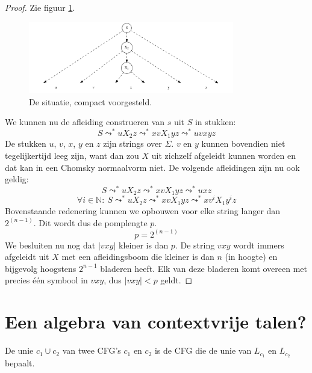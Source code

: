 \documentclass[main.tex]{subfiles}
\begin{document}
\begin{st}
\begin{proof}
    Zie figuur \ref{fig:afleidingsboom-compact}.
    \begin{figure}[H]
      \centering
      \includegraphics[width=0.8\textwidth]{assets/pompend-lemma-herhaling.png}      
      \caption{De situatie, compact voorgesteld.}
      \label{fig:afleidingsboom-compact}
    \end{figure}
    We kunnen nu de afleiding construeren van $s$ uit $S$ in stukken:
    \[ S \leadsto^{*} uX_{2}z \leadsto^{*} xvX_{1}yz \leadsto^{*} uvxyz \]
    De stukken $u$, $v$, $x$, $y$ en $z$ zijn strings over $\Sigma$.
    $v$ en $y$ kunnen bovendien niet tegelijkertijd leeg zijn, want dan zou $X$ uit zichzelf afgeleidt kunnen worden en dat kan in een Chomsky normaalvorm niet.
    De volgende afleidingen zijn nu ook geldig:
    \[ S \leadsto^{*} uX_{2}z \leadsto^{*} xvX_{1}yz \leadsto^{*} uxz \]
    \[ \forall i \in \mathbb{N}:\ S \leadsto^{*} uX_{2}z \leadsto^{*} xvX_{1}yz \leadsto^{*} xv^{i}X_{1}y^{i}z \]
    Bovenstaande redenering kunnen we opbouwen voor elke string langer dan $2^{(n-1)}$.
    Dit wordt dus de pomplengte $p$.
    \[ p = 2^{(n-1)} \]
    We besluiten nu nog dat $|vxy|$ kleiner is dan $p$.
    De string $vxy$ wordt immers afgeleidt uit $X$ met een afleidingsboom die kleiner is dan $n$ (in hoogte) en bijgevolg hoogstens $2^{n-1}$ bladeren heeft.
    Elk van deze bladeren komt overeen met precies \'e\'en symbool in $vxy$, dus $|vxy| < p$ geldt.
  \end{proof}
\end{st}

\section{Een algebra van contextvrije talen?}

\begin{de}
  De unie $c_{1} \cup c_{2}$ van twee CFG's $c_{1}$ en $c_{2}$ is de CFG die de unie van $L_{c_{1}}$ en $L_{c_{2}}$ bepaalt.
\end{de}
\end{document}
